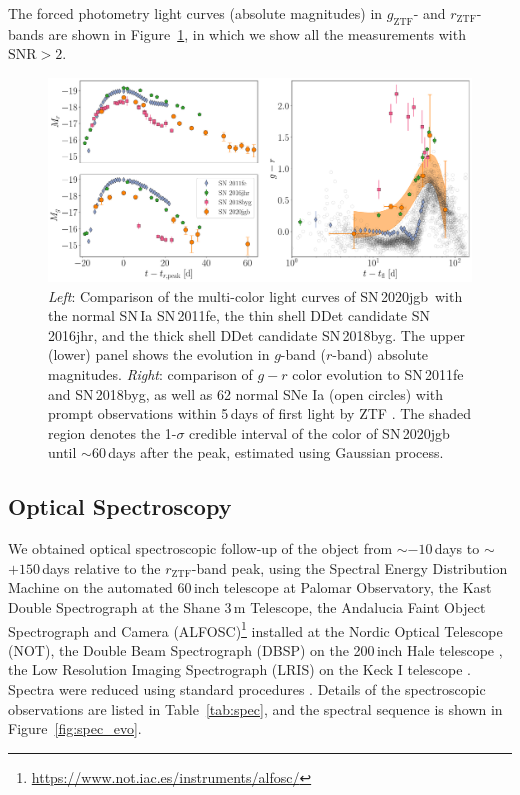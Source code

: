 \documentclass[twocolumn]{aastex631}
\newcommand{\sn}{SN\,2020jgb}
\begin{document}
The forced photometry light curves (absolute magnitudes) in $g_\mathrm{ZTF}$- and $r_\mathrm{ZTF}$-bands are shown in Figure~\ref{fig:photometry}, in which we show all the measurements with $\mathrm{SNR}>2$.

\begin{figure}
    \centering
    \includegraphics[width=\textwidth]{photometry.pdf}
    \caption{\textit{Left}: Comparison of the multi-color light curves  of \sn\ with the normal SN\,Ia SN\,2011fe, the thin shell DDet candidate SN\,2016jhr, and the thick shell DDet candidate SN\,2018byg. The upper (lower) panel shows the evolution in $g$-band ($r$-band) absolute magnitudes. \textit{Right}: comparison of $g-r$ color evolution to SN\,2011fe and SN\,2018byg, as well as 62 normal SNe Ia (open circles) with prompt observations within 5\,days of first light by ZTF \citep{Bulla2020}. The shaded region denotes the 1-$\sigma$ credible interval of the color of SN\,2020jgb until $\sim$60\,days after the peak, estimated using Gaussian process.}
    \label{fig:photometry}
\end{figure}

\subsection{Optical Spectroscopy}\label{sec:optical_spec}
We obtained optical spectroscopic follow-up of the object from $\sim$$-10$\,days to $\sim$$+150$\,days relative to the $r_\mathrm{ZTF}$-band peak, using the Spectral Energy Distribution Machine \citep[SEDM;][]{SEDM_2018} on the automated 60\,inch telescope \citep[P60;][]{P60_2006} at Palomar Observatory, the Kast Double Spectrograph \citep{miller1994kast} at the Shane 3\,m Telescope, the Andalucia Faint Object Spectrograph and Camera (ALFOSC)\footnote{\url{https://www.not.iac.es/instruments/alfosc/}} installed at the Nordic Optical Telescope (NOT), the Double Beam Spectrograph (DBSP) on the 200\,inch Hale telescope \citep[P200;][]{P200_1982}, the Low Resolution Imaging Spectrograph (LRIS) on the Keck I telescope \citep{Keck_1995}. Spectra were reduced using standard procedures \citep[e.g.,][]{Matheson_2000}. Details of the spectroscopic observations are listed in Table~\ref{tab:spec}, and the spectral sequence is shown in Figure~\ref{fig:spec_evo}.
\end{document}
